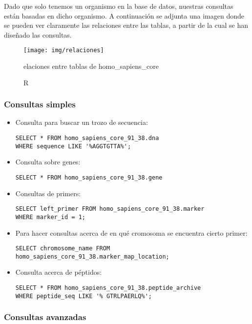 \documentclass[12pt,a4paper]{article}
\begin{document}
Dado que solo tenemos un organismo en la base de datos, nuestras consultas están basadas en dicho organismo. A continuación se adjunta una imagen donde se pueden ver claramente las relaciones entre las tablas, a partir de la cual se han diseñado las consultas.
\begin{figure}[!h]
\texttt{[image: img/relaciones]}
\caption Relaciones entre tablas de homo\_sapiens\_core
\label{fig2:rel}
\end{figure}
\newpage

\subsubsection{Consultas simples} \label{pto221}

\begin{itemize}
\item Consulta para buscar un trozo de secuencia:
\begin{verbatim}
SELECT * FROM homo_sapiens_core_91_38.dna 
WHERE sequence LIKE '%AGGTGTTA%';
\end{verbatim}

\item Consulta sobre genes:
\begin{verbatim}
SELECT * FROM homo_sapiens_core_91_38.gene
\end{verbatim}

\item Consultas de primers:
\begin{verbatim}
SELECT left_primer FROM homo_sapiens_core_91_38.marker 
WHERE marker_id = 1;
\end{verbatim}

\item Para hacer consultas acerca de en qué cromosoma se encuentra cierto primer:
\begin{verbatim}
SELECT chromosome_name FROM homo_sapiens_core_91_38.marker_map_location;
\end{verbatim}

\item Consulta acerca de péptidos:
\begin{verbatim}
SELECT * FROM homo_sapiens_core_91_38.peptide_archive 
WHERE peptide_seq LIKE '% GTRLPAERLQ%';
\end{verbatim}

\end{itemize}

\subsubsection{Consultas avanzadas} \label{pto222}
\end{document}

